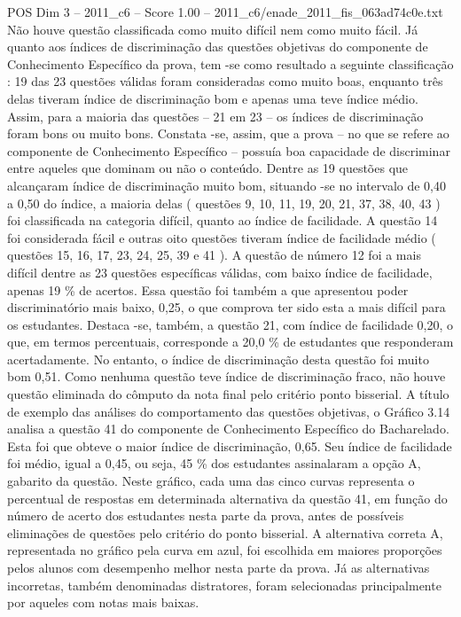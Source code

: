 \begin{textsample}{POS Dim 3 – 2011\_c6 – Score 1.00 – 2011\_c6/enade\_2011\_fis\_063ad74c0e.txt}
Não houve questão classificada como muito difícil nem como muito fácil.
Já quanto aos índices de discriminação das questões objetivas do componente de Conhecimento Específico da prova, tem -se como resultado a seguinte classificação : 19 das 23 questões válidas foram consideradas como muito boas, enquanto três delas tiveram índice de discriminação bom e apenas uma teve índice médio.
Assim, para a maioria das questões – 21 em 23 – os índices de discriminação foram bons ou muito bons.
Constata -se, assim, que a prova – no que se refere ao componente de Conhecimento Específico – possuía boa capacidade de discriminar entre aqueles que dominam ou não o conteúdo.
Dentre as 19 questões que alcançaram índice de discriminação muito bom, situando -se no intervalo de 0,40 a 0,50 do índice, a maioria delas ( questões 9, 10, 11, 19, 20, 21, 37, 38, 40, 43 ) foi classificada na categoria difícil, quanto ao índice de facilidade.
A questão 14 foi considerada fácil e outras oito questões tiveram índice de facilidade médio ( questões 15, 16, 17, 23, 24, 25, 39 e 41 ).
A questão de número 12 foi a mais difícil dentre as 23 questões específicas válidas, com baixo índice de facilidade, apenas 19 \% de acertos.
Essa questão foi também a que apresentou poder discriminatório mais baixo, 0,25, o que comprova ter sido esta a mais difícil para os estudantes.
Destaca -se, também, a questão 21, com índice de facilidade 0,20, o que, em termos percentuais, corresponde a 20,0 \% de estudantes que responderam acertadamente.
No entanto, o índice de discriminação desta questão foi muito bom 0,51.
Como nenhuma questão teve índice de discriminação fraco, não houve questão eliminada do cômputo da nota final pelo critério ponto bisserial.
A título de exemplo das análises do comportamento das questões objetivas, o Gráfico 3.14 analisa a questão 41 do componente de Conhecimento Específico do Bacharelado.
Esta foi que obteve o maior índice de discriminação, 0,65.
Seu índice de facilidade foi médio, igual a 0,45, ou seja, 45 \% dos estudantes assinalaram a opção A, gabarito da questão.
Neste gráfico, cada uma das cinco curvas representa o percentual de respostas em determinada alternativa da questão 41, em função do número de acerto dos estudantes nesta parte da prova, antes de possíveis eliminações de questões pelo critério do ponto bisserial.
A alternativa correta A, representada no gráfico pela curva em azul, foi escolhida em maiores proporções pelos alunos com desempenho melhor nesta parte da prova.
Já as alternativas incorretas, também denominadas distratores, foram selecionadas principalmente por aqueles com notas mais baixas.

\end{textsample}
